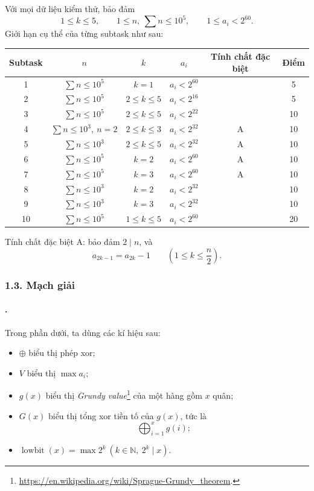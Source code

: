 \documentclass[11pt]{article}
\begin{document}
Với mọi dữ liệu kiểm thử, bảo đảm
\[
  1\le k\le 5,\qquad 1\le n,\ \sum n\le 10^5,\qquad 1\le a_i<2^{60}.
\]
Giới hạn cụ thể của từng subtask như sau:

\begin{center}
\small
\begin{tabular}{c c c c c c}
\textbf{Subtask} & \(n\) & \(k\) & \(a_i\) & \textbf{Tính chất đặc biệt} & \textbf{Điểm} \\
\hline
1 & \(\sum n\le 10^5\) & \(k=1\) & \(a_i<2^{60}\) & & 5 \\
2 & \(\sum n\le 10^5\) & \(2\le k\le 5\) & \(a_i<2^{16}\) & & 5 \\
3 & \(\sum n\le 10^5\) & \(2\le k\le 5\) & \(a_i<2^{22}\) & & 10 \\
4 & \(\sum n\le 10^3,\ n=2\) & \(2\le k\le 3\) & \(a_i<2^{32}\) & A & 10 \\
5 & \(\sum n\le 10^3\) & \(2\le k\le 5\) & \(a_i<2^{32}\) & A & 10 \\
6 & \(\sum n\le 10^5\) & \(k=2\) & \(a_i<2^{60}\) & A & 10 \\
7 & \(\sum n\le 10^5\) & \(k=3\) & \(a_i<2^{60}\) & A & 10 \\
8 & \(\sum n\le 10^3\) & \(k=2\) & \(a_i<2^{32}\) & & 10 \\
9 & \(\sum n\le 10^3\) & \(k=3\) & \(a_i<2^{32}\) & & 10 \\
10 & \(\sum n\le 10^5\) & \(1\le k\le 5\) & \(a_i<2^{60}\) & & 20
\end{tabular}
\end{center}

Tính chất đặc biệt A: bảo đảm \(2\mid n\), và
\[
  a_{2k-1}=a_{2k}-1\qquad \left(1\le k\le \frac n2\right).
\]

\subsubsection*{1.3. Mạch giải}

\paragraph{.}
Trong phần dưới, ta dùng các kí hiệu sau:

\begin{itemize}
\item \(\oplus\) biểu thị phép xor;
\item \(V\) biểu thị \(\max a_i\);
\item \(g(x)\) biểu thị \emph{Grundy value}\footnote{\url{https://en.wikipedia.org/wiki/Sprague-Grundy_theorem}.}
của một hàng gồm \(x\) quân;
\item \(G(x)\) biểu thị tổng xor tiền tố của \(g(x)\), tức là
\[
  \bigoplus_{i=1}^{x} g(i);
\]
\item \(\operatorname{lowbit}(x)=\max 2^k\ (k\in\mathbb N,\ 2^k\mid x)\).
\end{itemize}
\end{document}
